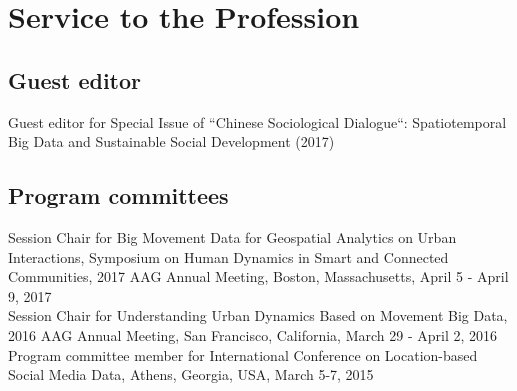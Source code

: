 \documentclass[11pt, a4paper]{article}
\begin{document}

\section*{Service to the Profession}
\subsection*{Guest editor}
Guest editor for Special Issue of ``Chinese Sociological Dialogue``: Spatiotemporal Big Data and Sustainable Social Development (2017)
\subsection*{Program committees}
Session Chair for Big Movement Data for Geospatial Analytics on Urban Interactions, Symposium on Human Dynamics in Smart and Connected Communities, 2017 AAG Annual Meeting, Boston, Massachusetts, April 5 - April 9, 2017\\
Session Chair for Understanding Urban Dynamics Based on Movement Big Data, 2016 AAG Annual Meeting, San Francisco, California, March 29 - April 2, 2016\\
Program committee member for International Conference on Location-based Social Media Data, Athens, Georgia, USA, March 5-7, 2015
\end{document}
